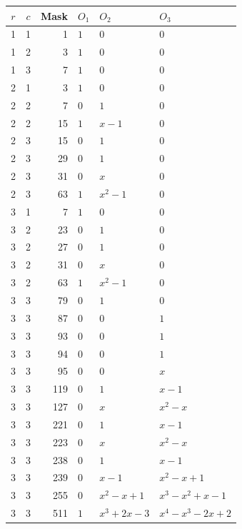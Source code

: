 \begin{longtable}{ccrlll}
\toprule
$r$ & $c$ & Mask & $O_1$ & $O_2$ & $O_3$\\
\midrule
\endhead
1 & 1 & 1 & $1$ & $0$ & $0$\\
1 & 2 & 3 & $1$ & $0$ & $0$\\
1 & 3 & 7 & $1$ & $0$ & $0$\\
2 & 1 & 3 & $1$ & $0$ & $0$\\
2 & 2 & 7 & $0$ & $1$ & $0$\\
2 & 2 & 15 & $1$ & $x-1$ & $0$\\
2 & 3 & 15 & $0$ & $1$ & $0$\\
2 & 3 & 29 & $0$ & $1$ & $0$\\
2 & 3 & 31 & $0$ & $x$ & $0$\\
2 & 3 & 63 & $1$ & $x^{2}-1$ & $0$\\
3 & 1 & 7 & $1$ & $0$ & $0$\\
3 & 2 & 23 & $0$ & $1$ & $0$\\
3 & 2 & 27 & $0$ & $1$ & $0$\\
3 & 2 & 31 & $0$ & $x$ & $0$\\
3 & 2 & 63 & $1$ & $x^{2}-1$ & $0$\\
3 & 3 & 79 & $0$ & $1$ & $0$\\
3 & 3 & 87 & $0$ & $0$ & $1$\\
3 & 3 & 93 & $0$ & $0$ & $1$\\
3 & 3 & 94 & $0$ & $0$ & $1$\\
3 & 3 & 95 & $0$ & $0$ & $x$\\
3 & 3 & 119 & $0$ & $1$ & $x-1$\\
3 & 3 & 127 & $0$ & $x$ & $x^{2}-x$\\
3 & 3 & 221 & $0$ & $1$ & $x-1$\\
3 & 3 & 223 & $0$ & $x$ & $x^{2}-x$\\
3 & 3 & 238 & $0$ & $1$ & $x-1$\\
3 & 3 & 239 & $0$ & $x-1$ & $x^{2}-x+1$\\
3 & 3 & 255 & $0$ & $x^{2}-x+1$ & $x^{3}-x^{2}+x-1$\\
3 & 3 & 511 & $1$ & $x^{3}+2x-3$ & $x^{4}-x^{3}-2x+2$\\
\bottomrule
\end{longtable}
